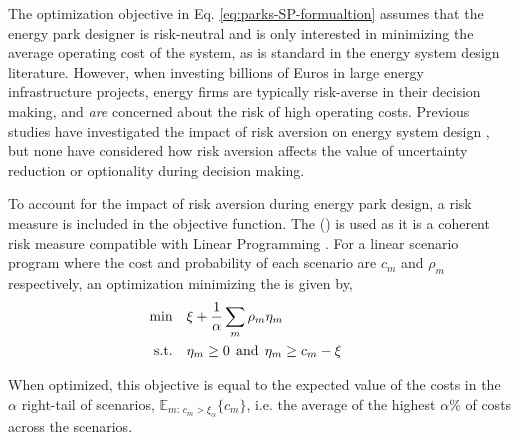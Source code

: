 
The optimization objective in Eq. \ref{eq:parks-SP-formualtion} assumes that the energy park designer is risk-neutral and is only interested in minimizing the average operating cost of the system, as is standard in the energy system design literature. However, when investing billions of Euros in large energy infrastructure projects, energy firms are typically risk-averse in their decision making, and \textit{are} concerned about the risk of high operating costs.
Previous studies have investigated the impact of risk aversion on energy system design \citep{pickering2019PracticalOptimisationDistrict,tostado-veliz2024RiskaverseElectrolyserSizing,mu2022CVaRbasedRiskAssessment}, but none have considered how risk aversion affects the value of uncertainty reduction or optionality during decision making.

To account for the impact of risk aversion during energy park design, a risk measure is included in the objective function. The  () is used as it is a coherent risk measure compatible with Linear Programming \citep{rockafellar2000OptimizationConditionalValueatrisk}.
For a linear scenario program where the cost and probability of each scenario are $c_m$ and $\rho_m$ respectively, an optimization minimizing the  is given by,
\begin{subequations} \label{eq:parks-cvar-defn}
    \begin{align}
        \addtocounter{equation}{-1}
        \text{min} & \quad \xi + \frac{1}{\alpha} \sum\limits_{m} \rho_{m}\eta_{m}\\
        \text{s.t.} & \quad \eta_{m} \geq 0 \:\: \text{and} \:\: \eta_{m} \geq c_{m} - \xi \tag*{}
    \end{align}
\end{subequations}

When optimized, this objective is equal to the expected value of the costs in the $\alpha$ right-tail of scenarios, $\mathbb{E}_{m:\, c_{m}>\xi_\alpha} \lbrace c_{m} \rbrace$, i.e. the average of the highest $\alpha\%$ of costs across the scenarios.

